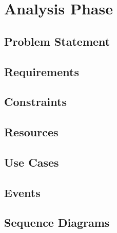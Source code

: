 
\section{Analysis Phase}

\subsection{Problem Statement}



\begin{comment}
\subsection{State of the Art}



\subsection{Inter-Partition Communication (IPC)}



\end{comment}

\nopagebreak

\subsection{Requirements}



\subsection{Constraints}



\subsection{Resources}


\pagebreak

\subsection{Use Cases}


\nopagebreak

\subsection{Events}


\pagebreak

\subsection{Sequence Diagrams}



